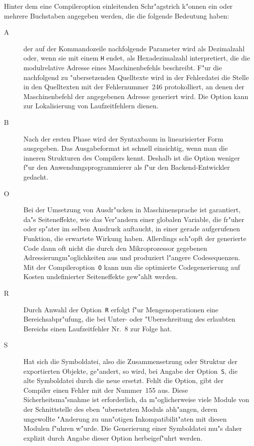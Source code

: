Hinter dem eine Compileroption einleitenden Schr"agstrich k"onnen ein oder
mehrere Buchstaben angegeben werden, die die folgende Bedeutung haben:
\begin{description}
\item[A] der auf der Kommandozeile nachfolgende Parameter wird als
  Dezimalzahl oder, wenn sie mit einem {\tt H} endet, als Hexadezimalzahl
  interpretiert, die die modulrelative Adresse eines Maschinenbefehls
  beschreibt.
  F"ur die nachfolgend zu "ubersetzenden Quelltexte wird in der Fehlerdatei
  die Stelle in den Quelltexten mit der Fehlernummer~246 protokolliert, an denen
  der Maschinenbefehl der angegebenen Adresse generiert wird.
  Die Option kann zur Lokalisierung von Laufzeitfehlern dienen.
\item[B] Nach der ersten Phase wird der Syntaxbaum in linearisierter Form
  ausgegeben.
  Das Ausgabeformat ist schnell einsichtig, wenn man die inneren Strukturen
  des Compilers kennt.
  Deshalb ist die Option weniger f"ur den Anwendungsprogrammierer als f"ur
  den Backend-Entwickler gedacht.
\item[O] Bei der Umsetzung von Ausdr"ucken in Maschinensprache ist
  garantiert, da"s Seiteneffekte, wie das Ver"andern einer globalen Variable,
  die fr"uher oder sp"ater im selben Ausdruck auftaucht, in einer gerade
  aufgerufenen Funktion, die erwartete Wirkung haben.
  Allerdings sch"opft der generierte Code dann oft nicht die durch den
  Mikroprozessor gegebenen Adressierungm"oglichkeiten aus und produziert
  l"angere Codesequenzen.
  Mit der Compileroption~{\tt O} kann nun die optimierte Codegenerierung
  auf Kosten undefinierter Seiteneffekte gew"ahlt werden.
\item[R] Durch Anwahl der Option~{\tt R} erfolgt f"ur Mengenoperationen
  eine Bereichsabpr"ufung, die bei Unter- oder "Uberschreitung des
  erlaubten Bereichs einen Laufzeitfehler Nr.~8 zur Folge hat.
\item[S] Hat sich die Symboldatei, also die Zusammensetzung oder Struktur
  der exportierten Objekte, ge"andert, so wird, bei Angabe der Option~{\tt S},
  die alte Symboldatei durch die neue ersetzt.
  Fehlt die Option, gibt der Compiler einen Fehler mit der Nummer~155 aus.
  Diese Sicherheitsma"snahme ist erforderlich, da m"oglicherweise viele
  Module von der Schnittstelle des eben "ubersetzten Moduls abh"angen,
  deren ungewollte "Anderung zu unn"otigen Inkompatibilit"aten mit diesen Modulen
  f"uhren w"urde.
  Die Generierung einer Symboldatei mu"s daher explizit durch Angabe dieser Option
  herbeigef"uhrt werden.

\end{description}
